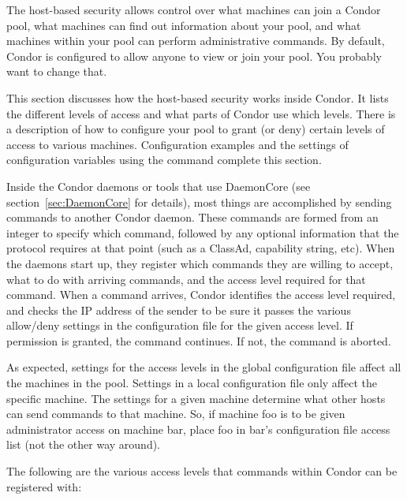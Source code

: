 The host-based security allows control over what machines can
join a Condor pool, what machines can find out information about
your pool, and what machines within your pool can perform
administrative commands.  By default, Condor is configured to allow
anyone to view or join your pool.  You probably want to change that.

This section discusses how the host-based security works inside Condor.
It lists the different levels of access and what
parts of Condor use which levels.
There is a description of how to configure
your pool to grant (or deny) certain levels of access to various
machines.
Configuration examples and the settings of configuration variables
using the  command complete this section.

Inside the Condor daemons or tools that use DaemonCore (see
section~\ref{sec:DaemonCore} for details), most
things are accomplished by sending commands to another Condor daemon.
These commands are formed from an integer to specify which command,
followed
by any optional information that the protocol requires at that point
(such as a ClassAd, capability string, etc).
When the daemons start up,
they register which commands they are willing to accept, what to
do with arriving commands, and the access level required for
that command.
When a command arrives, Condor identifies the  access level
required, and checks the IP address of the sender to be
sure it passes the various allow/deny settings
in the configuration file for the given access level.
If permission is granted, the command continues. 
If not, the command is aborted.

As expected, settings for the access levels in the global
configuration file affect all the machines in the pool.
Settings in a local configuration file only affect the specific machine.
The settings for a given machine determine what other hosts can send
commands to that machine.
So, if machine foo is to be given 
administrator access on machine bar, place foo in
bar's configuration file access list (not the other way around).


The following are the various access levels that commands within
Condor can be registered with:

